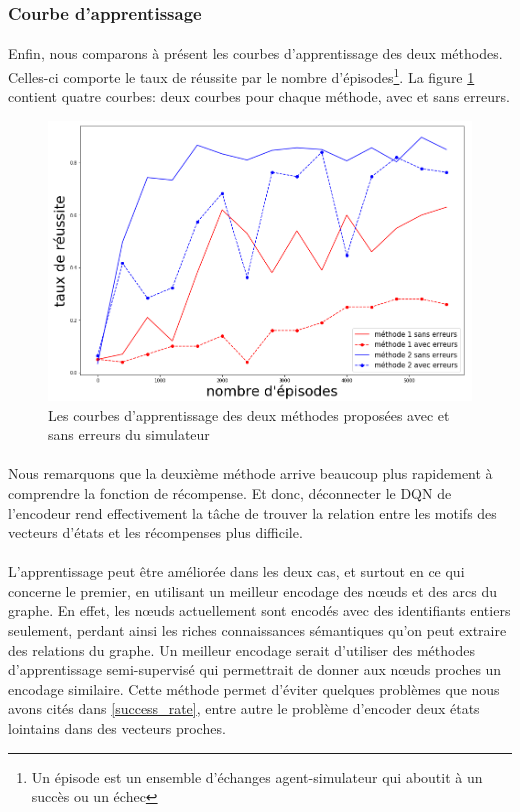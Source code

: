 \subsubsection{Courbe d'apprentissage}
\paragraph{}Enfin, nous comparons à présent les courbes d'apprentissage des deux méthodes. Celles-ci comporte le taux de réussite par le nombre d'épisodes\footnote{Un épisode est un ensemble d'échanges agent-simulateur qui aboutit à un succès ou un échec}. La figure \ref{courbes} contient quatre courbes: deux courbes pour chaque méthode, avec et sans erreurs.
\begin{figure}[H] 
	\centering
	\includegraphics[width=0.95\linewidth]{images/Realisation/DM/courbes.png}
	\caption{Les courbes d'apprentissage des deux méthodes proposées avec et sans erreurs du simulateur}\label{courbes}
\end{figure}
\paragraph{}Nous remarquons que la deuxième méthode arrive beaucoup plus rapidement à comprendre la fonction de récompense. Et donc, déconnecter le DQN de l'encodeur rend effectivement la tâche de trouver la relation entre les motifs des vecteurs d'états et les récompenses plus difficile.
\paragraph{} L'apprentissage peut être améliorée dans les deux cas, et surtout en ce qui concerne le premier, en utilisant un meilleur encodage des n\oe{}uds et des arcs du graphe. En effet, les n\oe{}uds actuellement sont encodés avec des identifiants entiers seulement, perdant ainsi les riches connaissances sémantiques qu'on peut extraire des relations du graphe. Un meilleur encodage serait d'utiliser des méthodes d'apprentissage semi-supervisé qui permettrait de donner aux n\oe{}uds proches un encodage similaire. Cette méthode permet d'éviter quelques problèmes que nous avons cités dans \ref{success_rate}, entre autre le problème d'encoder deux états lointains dans des vecteurs proches.


